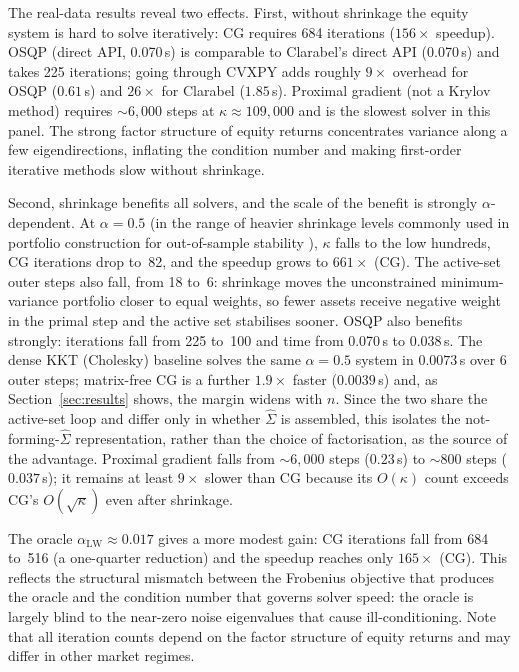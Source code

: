The real-data results reveal two effects. First, without shrinkage the equity system is hard to solve iteratively:
CG requires 684 iterations ($156\times$ speedup). OSQP (direct API, 0.070\,s)
is comparable to Clarabel's direct API (0.070\,s) and takes 225 iterations; going through CVXPY adds roughly $9\times$ overhead for OSQP
($0.61$\,s) and $26\times$ for Clarabel ($1.85$\,s). Proximal gradient (not a Krylov method) requires $\sim\!6{,}000$
steps at $\kappa \approx 109{,}000$ and is the slowest solver in this panel. The strong factor structure of equity
returns concentrates variance along a few eigendirections, inflating the condition number and making first-order
iterative methods slow without shrinkage.

Second, shrinkage benefits all solvers, and the scale of the benefit is strongly $\alpha$-dependent.
At $\alpha=0.5$ (in the range of heavier shrinkage levels commonly used in portfolio
construction for out-of-sample stability \cite{demiguel2009,ledoit2003jpm}), $\kappa$ falls to
the low hundreds, CG iterations drop to~82, and the speedup grows to $661\times$ (CG).
The active-set outer steps also fall, from 18 to~6: shrinkage moves the unconstrained minimum-variance
portfolio closer to equal weights, so fewer assets receive negative weight in the primal step and the
active set stabilises sooner.
OSQP also benefits strongly: iterations fall from 225 to~100 and time from 0.070\,s to 0.038\,s.
The dense KKT (Cholesky) baseline solves the same $\alpha=0.5$ system in $0.0073$\,s over 6 outer
steps; matrix-free CG is a further $1.9\times$ faster ($0.0039$\,s) and, as Section~\ref{sec:results}
shows, the margin widens with $n$. Since the two share the active-set loop and differ only in whether
$\hat\Sigma$ is assembled, this isolates the not-forming-$\hat\Sigma$ representation, rather than the
choice of factorisation, as the source of the advantage.
Proximal gradient falls from $\sim\!6{,}000$ steps ($0.23$\,s) to $\sim\!800$ steps ($0.037$\,s);
it remains at least $9\times$ slower than CG because its $O(\kappa)$ count exceeds CG's $O(\sqrt{\kappa})$
even after shrinkage.

The oracle $\alpha_{\mathrm{LW}} \approx 0.017$ gives a more modest gain: CG iterations fall from
684 to~516 (a one-quarter reduction) and the speedup reaches only $165\times$ (CG).
This reflects the structural mismatch between the Frobenius objective that produces the oracle and the
condition number that governs solver speed: the oracle is largely blind to the near-zero noise eigenvalues
that cause ill-conditioning.
Note that all iteration counts depend on the factor structure of equity returns and may differ in other market regimes.


